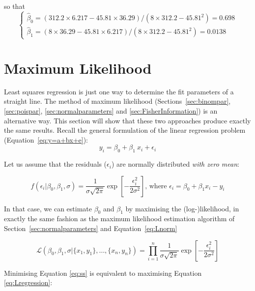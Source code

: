 \noindent so that
\begin{equation*}
\begin{cases}
  \hat{\beta}_0 = \left(312.2 \times 6.217 - 45.81 \times 36.29 \right) /
  \left(8 \times 312.2 - 45.81^2\right) = 0.698 \\
  \hat{\beta}_1 = \left( 8 \times 36.29 - 45.81 \times 6.217 \right) /
  \left(8 \times 312.2 - 45.81^2\right) = 0.0138
\end{cases}
\end{equation*}

\section{Maximum Likelihood}
\label{sec:MLregression}

Least squares regression is just one way to determine the fit
parameters of a straight line.  The method of maximum likelihood
(Sections~\ref{sec:binompar}, \ref{sec:poispar},
\ref{sec:normalparameters} and \ref{sec:FisherInformation}) is an
alternative way. This section will show that these two approaches
produce exactly the same results. Recall the general formulation of
the linear regression problem (Equation~\ref{eq:y=a+bx+e}):
\begin{equation*}
  y_i = \beta_0 + \beta_1~x_i + \epsilon_i
\end{equation*}

Let us assume that the residuals ($\epsilon_i$) are normally
distributed \emph{with zero mean}:

\begin{equation}
  f(\epsilon_i|\beta_0,\beta_1,\sigma) = \frac{1}{\sigma\sqrt{2\pi}}
  \exp\!\left[-\frac{\epsilon_i^2}{2\sigma^2}\right] \mbox{,~where~}
  \epsilon_i = \beta_0 + \beta_1 x_i - y_i
  \label{eq:normalresid}
\end{equation}

In that case, we can estimate $\beta_0$ and $\beta_1$ by maximising
the (log-)likelihood, in exactly the same fashion as the maximum
likelihood estimation algorithm of Section~\ref{sec:normalparameters}
and Equation~\ref{eq:Lnorm}

\begin{equation}
  \mathcal{L}(\beta_0,\beta_1,\sigma|\{x_1,y_1\},\ldots,\{x_n,y_n\}) =
  \prod\limits_{i=1}^{n}\frac{1}{\sigma\sqrt{2\pi}}
  \exp\!\left[-\frac{\epsilon_i^2}{2\sigma^2}\right]
  \label{eq:Lregression}
\end{equation}

Minimising Equation \ref{eq:ss} is equivalent to maximising Equation
\ref{eq:Lregression}:

